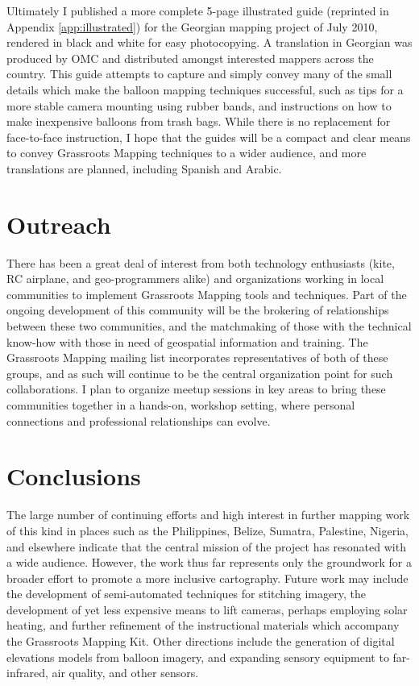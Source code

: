 \documentclass[11pt,oneside,notitlepage]{report}
\begin{document}
Ultimately I published a more complete 5-page illustrated guide (reprinted in Appendix \ref{app:illustrated}) for the Georgian mapping project of July 2010, rendered in black and white for easy photocopying. A translation in Georgian was produced by \ac{OMC} and distributed amongst interested mappers across the country. This guide attempts to capture and simply convey many of the small details which make the balloon mapping techniques successful, such as tips for a more stable camera mounting using rubber bands, and instructions on how to make inexpensive balloons from trash bags. While there is no replacement for face-to-face instruction, I hope that the guides will be a compact and clear means to convey Grassroots Mapping techniques to a wider audience, and more translations are planned, including Spanish and Arabic. 

\section{Outreach}

There has been a great deal of interest from both technology enthusiasts (kite, RC airplane, and geo-programmers alike) and organizations working in local communities to implement Grassroots Mapping tools and techniques. Part of the ongoing development of this community will be the brokering of relationships between these two communities, and the matchmaking of those with the technical know-how with those in need of geospatial information and training. The Grassroots Mapping mailing list incorporates representatives of both of these groups, and as such will continue to be the central organization point for such collaborations. I plan to organize meetup sessions in key areas to bring these communities together in a hands-on, workshop setting, where personal connections and professional relationships can evolve.

\section{Conclusions}

The large number of continuing efforts and high interest in further mapping work of this kind in places such as the Philippines, Belize, Sumatra, Palestine, Nigeria, and elsewhere indicate that the central mission of the project has resonated with a wide audience. However, the work thus far represents only the groundwork for a broader effort to promote a more inclusive cartography. Future work may include the development of semi-automated techniques for stitching imagery, the development of yet less expensive means to lift cameras, perhaps employing solar heating, and further refinement of the instructional materials which accompany the Grassroots Mapping Kit. Other directions include the generation of digital elevations models from balloon imagery, and expanding sensory equipment to far-infrared, air quality, and other sensors. 
\end{document}
